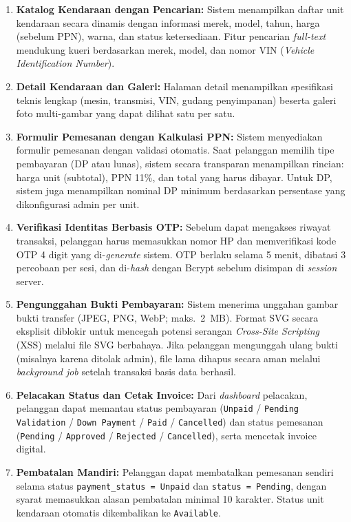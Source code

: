 \documentclass[11pt, a5paper]{article}
\begin{document}
\begin{enumerate}[label=\arabic*.]
  \item \textbf{Katalog Kendaraan dengan Pencarian:} Sistem menampilkan daftar
        unit kendaraan secara dinamis dengan informasi merek, model, tahun, harga
        (sebelum PPN), warna, dan status ketersediaan. Fitur pencarian
        \textit{full-text} mendukung kueri berdasarkan merek, model, dan nomor
        VIN (\textit{Vehicle Identification Number}).

  \item \textbf{Detail Kendaraan dan Galeri:} Halaman detail menampilkan
        spesifikasi teknis lengkap (mesin, transmisi, VIN, gudang penyimpanan)
        beserta galeri foto multi-gambar yang dapat dilihat satu per satu.

  \item \textbf{Formulir Pemesanan dengan Kalkulasi PPN:} Sistem menyediakan
        formulir pemesanan dengan validasi otomatis. Saat pelanggan memilih tipe
        pembayaran (DP atau lunas), sistem secara transparan menampilkan rincian:
        harga unit (subtotal), PPN 11\%, dan total yang harus dibayar. Untuk DP,
        sistem juga menampilkan nominal DP minimum berdasarkan persentase yang
        dikonfigurasi admin per unit.

  \item \textbf{Verifikasi Identitas Berbasis OTP:} Sebelum dapat mengakses
        riwayat transaksi, pelanggan harus memasukkan nomor HP dan memverifikasi
        kode OTP 4 digit yang di-\textit{generate} sistem. OTP berlaku selama
        5 menit, dibatasi 3 percobaan per sesi, dan di-\textit{hash} dengan
        Bcrypt sebelum disimpan di \textit{session} server.

  \item \textbf{Pengunggahan Bukti Pembayaran:} Sistem menerima unggahan gambar
        bukti transfer (JPEG, PNG, WebP; maks.\ 2~MB). Format SVG secara eksplisit
        diblokir untuk mencegah potensi serangan \textit{Cross-Site Scripting}
        (XSS) melalui file SVG berbahaya. Jika pelanggan mengunggah ulang bukti
        (misalnya karena ditolak admin), file lama dihapus secara aman melalui
        \textit{background job} setelah transaksi basis data berhasil.

  \item \textbf{Pelacakan Status dan Cetak Invoice:} Dari \textit{dashboard}
        pelacakan, pelanggan dapat memantau status pembayaran
        (\texttt{Unpaid} / \texttt{Pending Validation} / \texttt{Down Payment}
        / \texttt{Paid} / \texttt{Cancelled}) dan status pemesanan
        (\texttt{Pending} / \texttt{Approved} / \texttt{Rejected} /
        \texttt{Cancelled}), serta mencetak invoice digital.

  \item \textbf{Pembatalan Mandiri:} Pelanggan dapat membatalkan pemesanan
        sendiri selama status \texttt{payment\_status = Unpaid} dan
        \texttt{status = Pending}, dengan syarat memasukkan alasan pembatalan
        minimal 10 karakter. Status unit kendaraan otomatis dikembalikan ke
        \texttt{Available}.
\end{enumerate}
\end{document}
